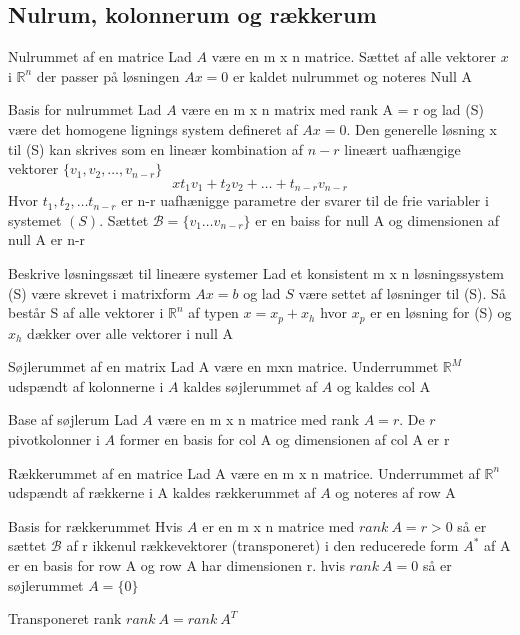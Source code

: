 \documentclass[a4paper,fleqn]{article}
\newcommand{\RR}{\mathbb{R}}
\newcommand{\B}{\mathcal{B}}
\begin{document}
	\subsection{Nulrum, kolonnerum og rækkerum}
	\begin{definition}{Nulrummet af en matrice}{}
		Lad $A$ være en m x n matrice. Sættet af alle vektorer $x$ i $\RR^n$ der passer på
		løsningen $Ax = 0$ er kaldet nulrummet og noteres Null A
	\end{definition}
	\begin{theorem}{Basis for nulrummet}{}
		Lad $A$ være en m x n matrix med rank A = r og lad (S) være det homogene lignings
		system defineret af $Ax = 0$. Den generelle løsning x til (S) kan skrives som en
		lineær kombination af $n-r$ lineært uafhængige vektorer $\{ v_1, v_2, \dots, v_{n-r}\}$
		\[ x t_1v_1+t_2v_2 + \dots + t_{n-r}v_{n-r}\]
		Hvor $t_1, t_2, \dots t_{n-r}$ er n-r uafhænigge parametre der svarer til de frie
		variabler i systemet $(S)$. Sættet $\B = \{ v_1 \dots v_{n-r}\}$ er en baiss for
		null A og dimensionen af null A er n-r
	\end{theorem}
	\begin{theorem}{Beskrive løsningssæt til lineære systemer}{}
		Lad et konsistent m x n løsningssystem (S) være skrevet i matrixform $Ax = b$ og
		lad $S$ være settet af løsninger til (S). Så består S af alle vektorer i $\RR^n$
		af typen $x = x_p + x_h$ hvor $x_p$ er en løsning for (S) og $x_h$ dækker over
		alle vektorer i null A
	\end{theorem}
	\begin{definition}{Søjlerummet af en matrix}{}
		Lad A være en mxn matrice. Underrummet $\RR^M$ udspændt af kolonnerne i $A$ 
		kaldes søjlerummet af $A$ og kaldes col A
	\end{definition}
	\begin{theorem}{Base af søjlerum}{}
		Lad $A$ være en m x n matrice med rank $A = r$. De $r$ pivotkolonner i $A$ former
		en basis for col A og dimensionen af col A er r
	\end{theorem}
	\begin{definition}{Rækkerummet af en matrice}{}
		Lad A være en m x n matrice. Underrummet af $\RR^n$ udspændt af rækkerne i A kaldes
		rækkerummet af $A$ og noteres af row A
	\end{definition}
	\begin{theorem}{Basis for rækkerummet}{}
		Hvis $A$ er en m x n matrice med $rank\ A = r > 0$ så er sættet $\B$ af r ikkenul
		rækkevektorer (transponeret) i den reducerede form $A^*$ af A er en basis for row A
		og row A har dimensionen r. hvis $rank\ A = 0$ så er søjlerummet $A = \{0\}$
	\end{theorem}
	\begin{theorem}{Transponeret rank}{}
		$rank\ A = rank\ A^T$
	\end{theorem}
\end{document}
